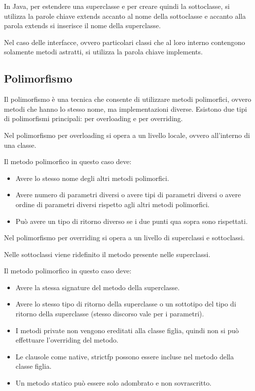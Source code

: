 \documentclass[a4paper,12pt,times,numbered,print,index]{article}
\begin{document}
In Java, per estendere una superclasse e per creare quindi la sottoclasse, si utilizza la parole chiave extends accanto al nome della sottoclasse e accanto alla parola extends si inserisce il nome della superclasse.

Nel caso delle interfacce, ovvero particolari classi che al loro interno contengono solamente metodi astratti, si utilizza la parola chiave implements.
\textcite{corsoinformatica}

\subsection{Polimorfismo}
Il polimorfismo è una tecnica che consente di utilizzare metodi polimorfici, ovvero metodi che hanno lo stesso nome, ma implementazioni diverse.
Esistono due tipi di polimorfismi principali: per overloading e per overriding.

Nel polimorfismo per overloading si opera a un livello locale, ovvero all’interno di una classe.

Il metodo polimorfico in questo caso deve:
\begin{itemize}
	\item Avere lo stesso nome degli altri metodi polimorfici.
	\item Avere numero di parametri diversi o avere tipi di parametri diversi o avere ordine di parametri diversi rispetto agli altri metodi polimorfici.
	\item Può avere un tipo di ritorno diverso se i due punti qua sopra sono rispettati.
\end{itemize}
Nel polimorfismo per overriding si opera a un livello di superclassi e sottoclassi.

Nelle sottoclassi viene ridefinito il metodo presente nelle superclassi.

Il metodo polimorfico in questo caso deve:
\begin{itemize}
	\item Avere la stessa signature del metodo della superclasse.
	\item Avere lo stesso tipo di ritorno della superclasse o un sottotipo del tipo di ritorno della superclasse (stesso discorso vale per i parametri).
	\item I metodi private non vengono ereditati alla classe figlia, quindi non si può effettuare l’overriding del metodo.
	\item Le clausole come native, strictfp possono essere incluse nel metodo della classe figlia.
	\item Un metodo statico può essere solo adombrato e non sovrascritto.
\end{itemize}
\textcite{polimorfismo}
\end{document}
